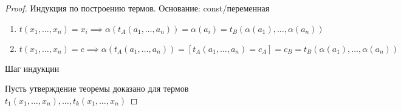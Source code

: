 \documentclass[a4paper]{article}
\theoremstyle{definition}
\theoremstyle{remark}
\begin{document}
    \begin{proof}
        Индукция по построению термов. Основание: const/переменная

        \begin{enumerate}
            \item $t(x_1, \dots, x_n) = x_i\implies \alpha (t_A(a_1, \dots, a_n)) = \alpha(a_i) = t_B (\alpha(a_1), \dots, \alpha(a_n))$
            \item $t(x_1, \dots, x_n) = c \implies \alpha(t_A(a_1, \dots, a_n))= [t_A(a_1, \dots, a_n) = c_A] = c_B = t_B(\alpha(a_1), \dots, \alpha(a_n))$
        \end{enumerate}

        Шаг индукции

        Пусть утверждение теоремы доказано для термов $t_1(x_1, \dots, x_n), \dots, t_k (x_1, \dots, x_n)$
    \end{proof}
\end{document}
